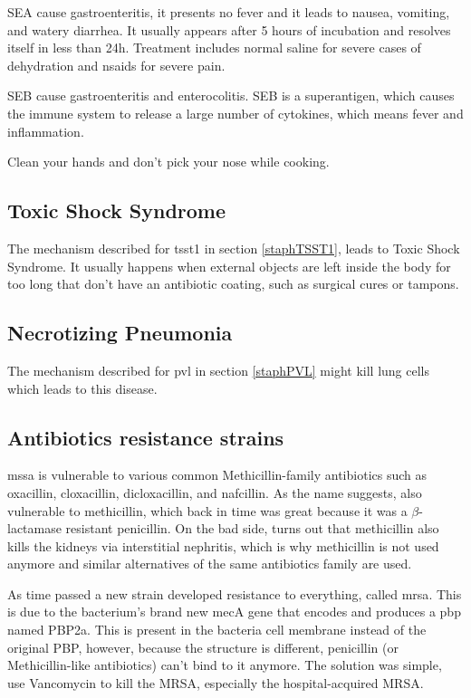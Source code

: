 SEA cause gastroenteritis, it presents no fever and it leads to nausea, vomiting, and watery diarrhea. It usually appears after 5 hours of incubation and resolves itself in less than 24h. Treatment includes normal saline for severe cases of dehydration and \gls{nsaids} for severe pain.

SEB cause gastroenteritis and enterocolitis. SEB is a superantigen, which causes the immune system to release a large number of cytokines, which means fever and inflammation. 

Clean your hands and don't pick your nose while cooking.

\subsection{Toxic Shock Syndrome}

The mechanism described for \gls{tsst1} in section \ref{staphTSST1}, leads to Toxic Shock Syndrome. It usually happens when external objects are left inside the body for too long that don't have an antibiotic coating, such as surgical cures or tampons.

\subsection{Necrotizing Pneumonia}

The mechanism described for \gls{pvl} in section \ref{staphPVL} might kill lung cells which leads to this disease.


\subsection{Antibiotics resistance strains}

\gls{mssa} is vulnerable to various common Methicillin-family antibiotics such as oxacillin, cloxacillin, dicloxacillin, and nafcillin. As the name suggests, also vulnerable to methicillin, which back in time was great because it was a $\beta$-lactamase resistant penicillin. On the bad side, turns out that methicillin also kills the kidneys via interstitial nephritis, which is why methicillin is not used anymore and similar alternatives of the same antibiotics family are used.

As time passed a new strain developed resistance to everything, called \gls{mrsa}. This is due to the bacterium's brand new mecA gene that encodes and produces a \gls{pbp} named PBP2a. This is present in the bacteria cell membrane instead of the original PBP, however, because the structure is different, penicillin (or Methicillin-like antibiotics) can't bind to it anymore. The solution was simple, use Vancomycin to kill the MRSA, especially the hospital-acquired MRSA.

